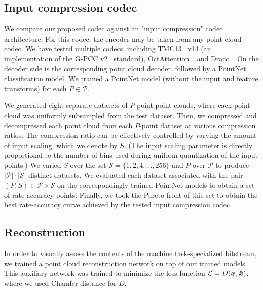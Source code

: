 \subsection{Input compression codec}

We compare our proposed codec against an "input compression" codec architecture.
For this codec, the encoder may be taken from any point cloud codec.
We have tested multiple codecs, including TMC13~\cite{mpeg2021tmc13} v14 (an implementation of the G-PCC v2~\cite{mpeg2019gpccv2} standard), OctAttention~\cite{fu2022octattention}, and Draco~\cite{google2017draco}.
On the decoder side is the corresponding point cloud decoder, followed by a PointNet classification model.
We trained a PointNet model (without the input and feature transforms) for each $P \in \mathcal{P}$.

We generated eight separate datasets of $P$-point point clouds, where each point cloud was uniformly subsampled from the test dataset.
Then, we compressed and decompressed each point cloud from each $P$-point dataset at various compression ratios.
The compression ratio can be effectively controlled by varying the amount of input scaling, which we denote by $S$.
(The input scaling parameter is directly proportional to the number of bins used during uniform quantization of the input points.)
We varied $S$ over the set $\mathcal{S} = \{1, 2, 4, \ldots, 256\}$ and $P$ over $\mathcal{P}$ to produce $|\mathcal{P}| \cdot |\mathcal{S}|$ distinct datasets.
We evaluated each dataset associated with the pair $(P, S) \in \mathcal{P} \times \mathcal{S}$ on the correspondingly trained PointNet models to obtain a set of rate-accuracy points.
Finally, we took the Pareto front of this set to obtain the best rate-accuracy curve achieved by the tested input compression codec.



\subsection{Reconstruction}

In order to visually assess the contents of the machine task-specialized bitstream, we trained a point cloud reconstruction network on top of our trained models.
This auxiliary network was trained to minimize the loss function
$\mathcal{L} = D({\boldsymbol{x}}, {\boldsymbol{\hat{x}}})$,
where we used Chamfer distance for $D$.

